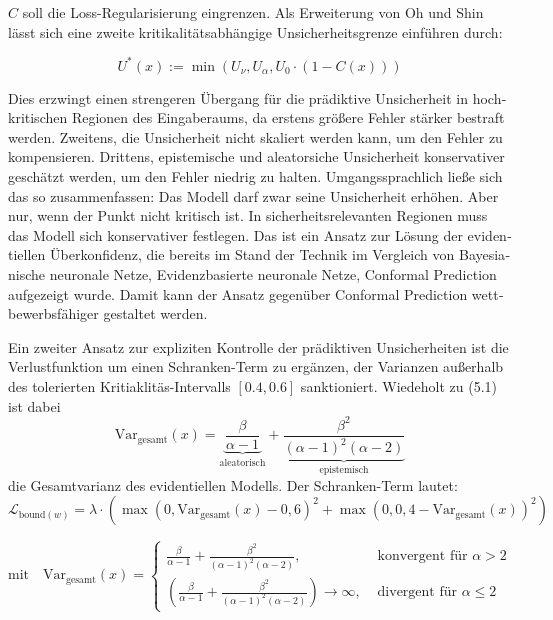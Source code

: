 \begin{otherlanguage}{ngerman}
$C$ soll die Loss-Regularisierung eingrenzen. Als Erweiterung von Oh und Shin lässt sich eine zweite kritikalitätsabhängige Unsicherheitsgrenze einführen durch:

\[
U^*(x) := \min \left( U_\nu, U_\alpha, U_0 \cdot (1 - C(x)) \right)
\]

Dies erzwingt einen strengeren Übergang für die prädiktive Unsicherheit in hochkritischen Regionen des Eingaberaums, da erstens größere Fehler stärker bestraft werden. Zweitens, die Unsicherheit nicht skaliert werden kann, um den Fehler zu kompensieren. Drittens, epistemische und aleatorsiche Unsicherheit konservativer geschätzt werden, um den Fehler niedrig zu halten. Umgangssprachlich ließe sich das so zusammenfassen: Das Modell darf zwar seine Unsicherheit erhöhen. Aber nur, wenn der Punkt nicht kritisch ist. In sicherheitsrelevanten Regionen muss das Modell sich konservativer festlegen. Das ist ein Ansatz zur Lösung der evidentiellen Überkonfidenz, die bereits im Stand der Technik im Vergleich von \gls{Bayesianische neuronale Netze}, \gls{Evidenzbasierte neuronale Netze}, \gls{Conformal Prediction} aufgezeigt wurde. Damit kann der Ansatz gegenüber \gls{Conformal Prediction} wettbewerbsfähiger gestaltet werden.

Ein zweiter Ansatz zur expliziten Kontrolle der prädiktiven Unsicherheiten ist die Verlustfunktion um einen Schranken-Term zu ergänzen, der Varianzen außerhalb des tolerierten Kritiaklitäs-Intervalls \([0{.}4, 0{.}6]\) sanktioniert. Wiedeholt zu (5.1) ist dabei \[
\text{Var}_{\text{gesamt}}(x) = \underbrace{\frac{\beta}{\alpha - 1}}_{\text{aleatorisch}} + \underbrace{\frac{\beta^2}{(\alpha - 1)^2(\alpha - 2)}}_{\text{epistemisch}}
\]
die Gesamtvarianz des evidentiellen Modells. Der Schranken-Term lautet:
\begin{equation}
\mathcal{L}_{\text{bound}(w)} = \lambda \cdot \left( 
  \max(0, \text{Var}_{\text{gesamt}}(x) - 0{,}6)^2 
  + \max(0, 0{,}4 - \text{Var}_{\text{gesamt}}(x))^2 
\right)
\label{eq:loss_varbound}
\end{equation}

\vspace{0.125\baselineskip}

\noindent
\begin{minipage}{\linewidth}
\[
\text{mit} \quad
\text{Var}_{\text{gesamt}}(x) =
\begin{cases}
\frac{\beta}{\alpha - 1} + \frac{\beta^2}{(\alpha - 1)^2 (\alpha - 2)},                                         & \text{ konvergent für } \alpha > 2 \\
\left( \frac{\beta}{\alpha - 1} + \frac{\beta^2}{(\alpha - 1)^2 (\alpha - 2)} \right) \longrightarrow \infty,   & \text{ divergent für } \alpha \leq 2
\end{cases}
\]
\vspace{0.125\baselineskip}
\noindent


\end{minipage}
\end{otherlanguage}
